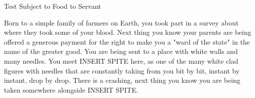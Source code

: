 \documentclass[char]{guildcamp4}
\begin{document}
\name{\cPlead{}}

Test Subject to Food to Servant

Born to a simple family of farmers on Earth, you took part in a survey about where they took some of your blood. Next thing you know your parents 
are being offered a generous payment for the right to make you a "ward of the state" in the name of the greater good. You are being sent to a place
with white walls and many needles. You meet INSERT SPITE  here, as one of the many white clad figures with needles that are constantly taking from
you bit by bit, instant by instant, drop by drop. There is a crashing, next thing you know you are being taken somewhere alongside INSERT SPITE.


\begin{itemz}[Goals]
	\item 
\end{itemz}

\begin{itemz}[Notes]
	\item 
\end{itemz}

\begin{contacts}
\end{contacts}
\end{document}
